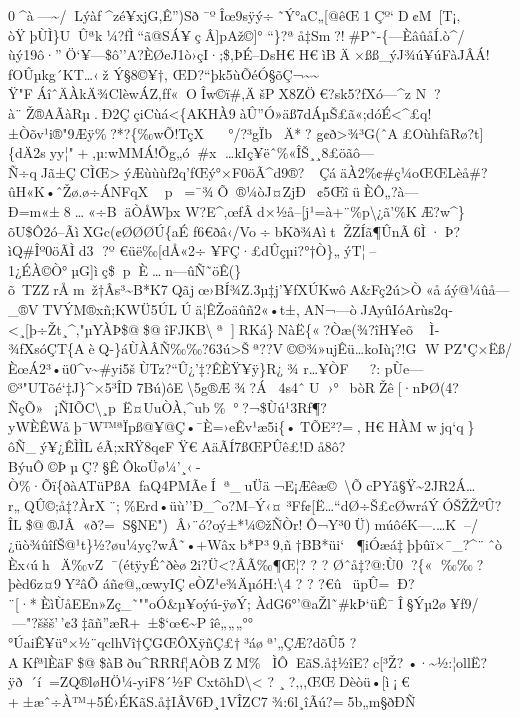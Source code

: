 0\^{}à---\textasciitilde/Lýàƒ\^{}zé¥xjG,Ê'')Sð¯ºÎœ9sÿý÷˜Ý°aC„{[}@êŒ1Çº`D¢M~{[}T¡‚
òŸþÙÌ\}UÛªk¼?fÌ``ã@SÁ¥çÂ{]}pAž©{]}°
``\}?ªå‡Sm?!\textquotesingle\#P˜-\{---ÈâûåÍ.ò\^{}/ùý19ô·''Ö`¥---\$ô''A?ÈØeJ1ò›çI·;\$,ÞÉ--DsH€H€ìB Ä×ßß\_ýJ¾ú¥úFàJÂÁ!ƒOÛµkg´KT\ldots‹ž
Ý§8©¥†‚ ŒD?­``þk5ùÕéÓ§õÇ¬\textasciitilde\textasciitilde{}
Ÿ"FÁîˆÄÀkÄ¾ClèwÁZ‚ƒƒ«OÎw©ï\#,ÄšPX8ZÖ€?sk5?ƒXó---\^{}z
N?à¨Ž®AÃàRµ.Ð2ÇçiCùá\textless\{AKHÀ9àÛ''Ó»äß7dÁµŠ£ã«;dó\textbar É\textless\^{}£q!±Òõv¹i®"9Æÿ\%?*?\{‰wÕ!TçX­
°/?³gÏbÄ*? g¢ð\textgreater¾³G(ˆA£OùhƒãRø? t{]}\{dÄ2syy¦"+‚µ:wMMÁ!Õg„ó\#x
\ldots kIç¥ëˆ\%«ÎŠ¸¸8£öãô---Ñ÷q Jã±ÇCÌŒ\textgreaterýÆùùùf2q'fŒý°×F0öÃ\^{}d9®?~ÇáäÀ2\%¢\#ç¼oŒŒLèå\#?ûH«K•ˆŽø.ø÷ÁNFqX
p=¯¾Õ®¼òJ¤ZjÐ~¢5ŒîüÈÔ„?à---Ð=m«±8\ldots«÷BäÒÅWþx
W?E\^{},œƒÂd×½å--{[}j¹=à+¨\%p\textbackslash¿ã'\%KÆ?w\^{}\}õU\$Ô2ó--ÃìXGc(¢ØØØÚ\{aÉ
ƒ6€ðâ‹/Vo÷bKð¾AìtŽZÍã¶ÛnÃ6Ì·Þ?ìQ\#Îº0öÃÌd3 ?º €üë‰{[}dÅ«2÷
¥FÇ·£dÛçµi?°†Ò\}„ýT¦--1¿ÉÀ©Ò°µG{]}ìç\$pÈ\ldotsn---ûÑ˜öÊ(\}õ~TZZrÅm~ž†Âs³\textasciitilde B*K7Qãjœ›BÍ¾Z.3µ‡j'¥fXÚKwôA\&Fç2ú\textgreater Ò«åáý@¼ûå---\_®VTVÝM®xñ;KWÜ5ÚLÚä¦ÊŽoäûñ2«•\textbar t±,AN¬---òJAyûIóArùs2q­\textless¸{[}þ÷Žt¸\^{}‚"µYÀÞ\$@\$@îF J KB\textbackslashª{]}RKá\}NàË\{«?Òæ(¾?îH¥eõ
Ì­¾ƒXsóÇT\{AèQ-\}áÙÀÂÑ ‰‰?63ú\textgreater Šª??V©©¾»ujÊü\ldots koIù¡?!G W
PZ"Ç×Ëß/ÈœÁ2³•ü0\^{}v\textasciitilde\#yi5šÙTz?{}``Û¿'‡?ÊÈŸ¥ÿ\}R¿¾
r\ldots¥ÒF  ?:
pÙe---©³"UTõé`‡J\}\^{}×5³ÎD7Bú)ôE\textbackslash5g®Æ¾?Á4s4ˆU
›°~bòRŽê{[}·n­ÞØ(4?
ÑçÕ»~¡ÑIÕC\textbackslash¸p~Ë¤UuÒÀ,\^{}ub\textquotesingle\%°?¬\$Ùú¹\textbar3Rf¶?yWÈÊWåþ¯W™ªÏp\textbar ß@¥@Ç•¯È=›eÊv¹æ5i\{•TÕE²?=‚H€HÀM
wjq`q\}ôÑ\_ý¥¿ÊÌÌLéÃ;xRŸ8q¢F Ÿ€AäÃÍ7ßŒPÛê£!Då8ô?BýuÔ©ÞµÇ?§ÊÔkoÜø¼'¸‹-Ò\%·Õï\{ðàATüPßAƒaQ4PMÃeÍª\_uÜä¬E¡Æêæ©\textbackslash ÕcPYå§Ÿ\textasciitilde2JR2Á\ldots r„QÛ©;å‡?ÀrX¨;\%Erd•üù''\textbar Ð\_\^{}o\textquotesingle?M--Ý‹¤
³Fƒ¢{[}Ë\ldots``dØ÷Š£cØwráÝÓŠŽŽºÛ?ÎL\$@®J Â«ð?=S§NE")Â›¨ó?oý±*¼©žÑÒr!Ô¬Y³0Ü)múôéK---.\ldots K--/¿üò¾ûîƒŠ@¹t\}½?øu¼yç?wÂ˜•+Wâxb*P³9‚ñ†BB*üi`
¶iÓæá‡þþûï×¯\_?\^{}¨ˆò Èx‹úh~Ä‰vZ¯(étÿyÉˆðèø2i?Ü\textless?ÂÃ‰¶Œ¦?  ?  ? 
Øˆ å‡?@:Ù0?\{« ‰‰?þèd6z¤9Y²âÕ áñ¢@„œwyIÇeÒZ¹e¾ÄµóH:\textbackslash4 ?  ? 
?€û~üpÛ=Ð?¨{[}·*ÈìÙåEEn»Zç\_˜""oÓ\&µ¥oýú-ÿøÝ;
ÀdG6°'@aŽl˜\#kÞ`üÊ¯Î§Ýµ2ø¥f9/ 
---"?ššš'\,'¢3‡ãñ''æR+~±\$`œ€\textasciitilde Pîê„„„°°°Úai\textbar Ê¥ü°×½¨qclhVî†ÇGŒÔXÿñÇ£†³áøª' „ÇÆ?dõÛ5
?AKƒªlÈäF\$@\$àBðu\^{}RRRf¦AÒBZM\%ÌÔEãS.å‡½îE?c{[}³Ž?•·\textasciitilde½:¦ollË?ÿð´í=ZQ®løHÖ¼-yiF8´½FCxtõhD\textbackslash\textless{}
? 
¸?‚‚‚ŒŒDèòü•{[}ì\textquotesingle¡€+±æˆ÷À™+5É›ÉKãS.å‡IÂV6Ð¸1VÎZC7¾:6l¸îÃú?=5b„m§ðÐÑ
